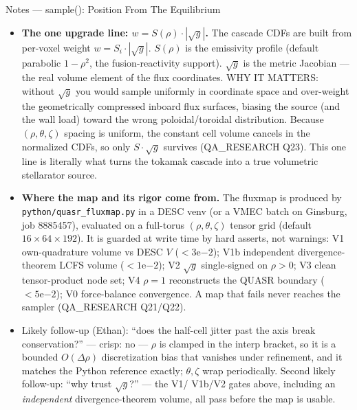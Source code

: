 \documentclass[11pt,aspectratio=169]{beamer}
\begin{document}
\begin{frame}[allowframebreaks]{Notes --- sample(): Position From The Equilibrium}
{\begin{itemize}
      $Z$, $\phi$ at the jittered point, then convert cylindrical$\to$Cartesian:
      \texttt{site.r = \{R cos PH, R sin PH, Z\}}. This is the analog of the tokamak's analytic
      \texttt{flux\_to\_cartesian}.
\item \textbf{The one upgrade line: $w = S(\rho)\cdot|\sqrt{g}|$.} The cascade CDFs are built from
      per-voxel weight $w = S_i\cdot|\sqrt{g}|$. $S(\rho)$ is the emissivity profile (default
      parabolic $1-\rho^2$, the fusion-reactivity support). $\sqrt{g}$ is the metric Jacobian --- the
      real volume element of the flux coordinates. WHY IT MATTERS: without $\sqrt{g}$ you would sample
      uniformly in coordinate space and over-weight the geometrically compressed inboard flux
      surfaces, biasing the source (and the wall load) toward the wrong poloidal/toroidal
      distribution. Because $(\rho,\theta,\zeta)$ spacing is uniform, the constant cell volume cancels
      in the normalized CDFs, so only $S\cdot\sqrt{g}$ survives (QA\_RESEARCH Q23). This one line is
      literally what turns the tokamak cascade into a true volumetric stellarator source.
\item \textbf{Where the map and its rigor come from.} The fluxmap is produced by
      \texttt{python/quasr\_fluxmap.py} in a DESC venv (or a VMEC batch on Ginsburg, job 8885457),
      evaluated on a full-torus $(\rho,\theta,\zeta)$ tensor grid (default $16\times64\times192$). It
      is guarded at write time by hard asserts, not warnings: V1 own-quadrature volume vs DESC $V$
      ($<3\mathrm{e}{-2}$); V1b independent divergence-theorem LCFS volume ($<1\mathrm{e}{-2}$); V2
      $\sqrt{g}$ single-signed on $\rho>0$; V3 clean tensor-product node set; V4 $\rho=1$
      reconstructs the QUASR boundary ($<5\mathrm{e}{-2}$); V0 force-balance convergence. A map that
      fails never reaches the sampler (QA\_RESEARCH Q21/Q22).
\item Likely follow-up (Ethan): ``does the half-cell jitter past the axis break conservation?'' ---
      crisp: no --- $\rho$ is clamped in the interp bracket, so it is a bounded $O(\Delta\rho)$
      discretization bias that vanishes under refinement, and it matches the Python reference exactly;
      $\theta,\zeta$ wrap periodically. Second likely follow-up: ``why trust $\sqrt{g}$?'' --- the V1/
      V1b/V2 gates above, including an \emph{independent} divergence-theorem volume, all pass before
      the map is usable.
\end{itemize}
}
\end{frame}
\end{document}
